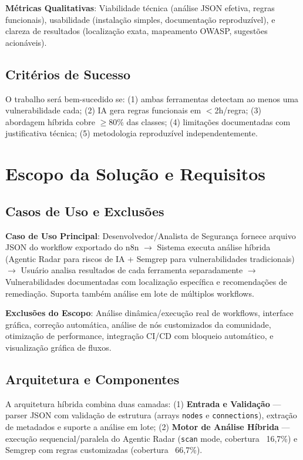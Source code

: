 \documentclass[12pt,a4paper]{article}
\begin{document}
\textbf{Métricas Qualitativas}: Viabilidade técnica (análise JSON efetiva, regras funcionais), usabilidade (instalação simples, documentação reproduzível), e clareza de resultados (localização exata, mapeamento OWASP, sugestões acionáveis).

\subsection{Critérios de Sucesso}

O trabalho será bem-sucedido se: (1) ambas ferramentas detectam ao menos uma vulnerabilidade cada; (2) IA gera regras funcionais em $<$2h/regra; (3) abordagem híbrida cobre $\geq$80\% das classes; (4) limitações documentadas com justificativa técnica; (5) metodologia reproduzível independentemente.

\section{Escopo da Solução e Requisitos}
\label{sec:escopo}

\subsection{Casos de Uso e Exclusões}

\textbf{Caso de Uso Principal}: Desenvolvedor/Analista de Segurança fornece arquivo JSON do workflow exportado do n8n $\rightarrow$ Sistema executa análise híbrida (Agentic Radar para riscos de IA + Semgrep para vulnerabilidades tradicionais) $\rightarrow$ Usuário analisa resultados de cada ferramenta separadamente $\rightarrow$ Vulnerabilidades documentadas com localização específica e recomendações de remediação. Suporta também análise em lote de múltiplos workflows.

\textbf{Exclusões do Escopo}: Análise dinâmica/execução real de workflows, interface gráfica, correção automática, análise de nós customizados da comunidade, otimização de performance, integração CI/CD com bloqueio automático, e visualização gráfica de fluxos.

\subsection{Arquitetura e Componentes}

A arquitetura híbrida combina duas camadas: (1) \textbf{Entrada e Validação} — parser JSON com validação de estrutura (arrays \texttt{nodes} e \texttt{connections}), extração de metadados e suporte a análise em lote; (2) \textbf{Motor de Análise Híbrida} — execução sequencial/paralela do Agentic Radar (\texttt{scan} mode, cobertura ~16,7\%) e Semgrep com regras customizadas (cobertura ~66,7\%).
\end{document}
